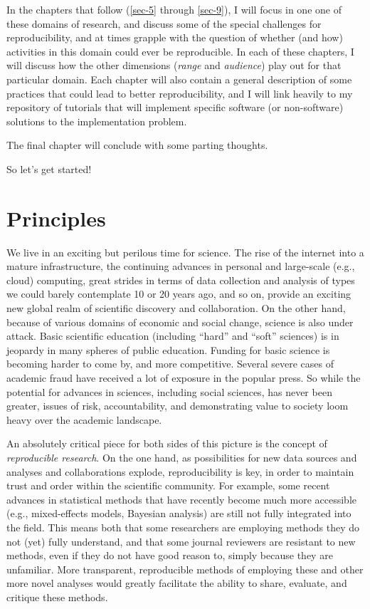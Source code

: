 \documentclass{book}
\begin{document}
In the chapters that follow (\ref{sec-5} through \ref{sec-9}), I will focus in one one of these domains of research, and discuss some of the special challenges for reproducibility, and at times grapple with the question of whether (and how) activities in this domain could ever be reproducible. In each of these chapters, I will discuss how the other dimensions (\emph{range} and \emph{audience}) play out for that particular domain. Each chapter will also contain a general description of some practices that could lead to better reproducibility, and I will link heavily to my repository of tutorials that will implement specific software (or non-software) solutions to the implementation problem.

The final chapter will conclude with some parting thoughts.

So let's get started!
\chapter{Principles}
\label{sec-2}
\label{principles}

We live in an exciting but perilous time for science. The rise of the internet into a mature infrastructure, the continuing advances in personal and large-scale (e.g., cloud) computing, great strides in terms of data collection and analysis of types we could barely contemplate 10 or 20 years ago, and so on, provide an exciting new global realm of scientific discovery and collaboration. On the other hand, because of various domains of economic and social change, science is also under attack.  Basic scientific education (including ``hard'' and ``soft'' sciences) is in jeopardy in many spheres of public education.  Funding for basic science is becoming harder to come by, and more competitive.  Several severe cases of academic fraud have received a lot of exposure in the popular press. So while the potential for advances in sciences, including social sciences, has never been greater, issues of risk, accountability, and demonstrating value to society loom heavy over the academic landscape.

An absolutely critical piece for both sides of this picture is the concept of \emph{reproducible research}.  On the one hand, as possibilities for new data sources and analyses and collaborations explode, reproducibility is key, in order to maintain trust and order within the scientific community.  For example, some recent advances in statistical methods that have recently become much more accessible (e.g., mixed-effects models, Bayesian analysis) are still not fully integrated into the field.  This means both that some researchers are employing methods they do not (yet) fully understand, and that some journal reviewers are resistant to new methods, even if they do not have good reason to, simply because they are unfamiliar. More transparent, reproducible methods of employing these and other more novel analyses would greatly facilitate the ability to share, evaluate, and critique these methods.
\end{document}
